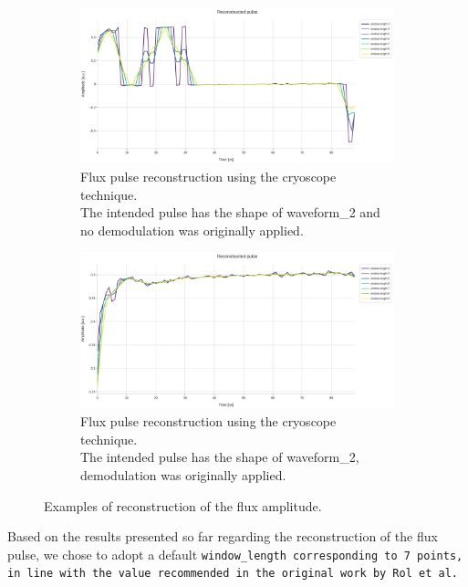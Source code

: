 \begin{figure}[h!]
    \begin{subfigure}[t]{0.495\textwidth}
        \includegraphics[width=\textwidth]{figures/png/Cryoscope/no_demod/long/amplitude_windows.png}
        \caption{Flux pulse reconstruction using the cryoscope technique.\\
        The intended pulse has the shape of waveform\_2 and no demodulation was originally applied.}
        \label{fig:amplitude:long_no_dem}
    \end{subfigure}
    \hfill
    \begin{subfigure}[t]{0.495\textwidth}
        \includegraphics[width=\textwidth]{figures/png/Cryoscope/demodulation/long/amplitude_windows.png}
        \caption{Flux pulse reconstruction using the cryoscope technique.\\
        The intended pulse has the shape of waveform\_2, demodulation was originally applied.}
        \label{fig:amplitude:long_dem}
    \end{subfigure}

    \caption{Examples of reconstruction of the flux amplitude.}
    \label{fig:amplitude}
\end{figure}

Based on the results presented so far regarding the reconstruction of the flux pulse, we chose to adopt a default \tt{window\_length} corresponding to 7 points, in line with the value recommended in the original work by Rol et al.

